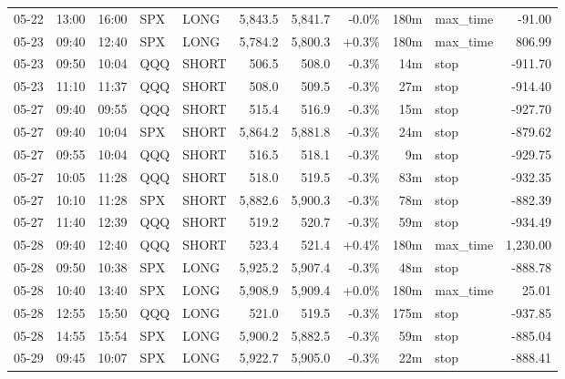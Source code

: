 \documentclass[11pt,a4paper,twoside]{article}
\begin{document}
\begin{center}
\begin{longtable}{>{\color{txtmain}}l l l l l r r r r >{\color{txtmain}}l r}
05-22 & 13:00 & 16:00 & SPX & LONG & 5,843.5 & 5,841.7 & \textcolor{lossred}{-0.0\%} & 180m & max\_time & \textcolor{lossred}{-91.00} \\
05-23 & 09:40 & 12:40 & SPX & LONG & 5,784.2 & 5,800.3 & \textcolor{wingreen}{+0.3\%} & 180m & max\_time & \textcolor{wingreen}{806.99} \\
05-23 & 09:50 & 10:04 & QQQ & SHORT & 506.5 & 508.0 & \textcolor{lossred}{-0.3\%} & 14m & stop & \textcolor{lossred}{-911.70} \\
05-23 & 11:10 & 11:37 & QQQ & SHORT & 508.0 & 509.5 & \textcolor{lossred}{-0.3\%} & 27m & stop & \textcolor{lossred}{-914.40} \\
05-27 & 09:40 & 09:55 & QQQ & SHORT & 515.4 & 516.9 & \textcolor{lossred}{-0.3\%} & 15m & stop & \textcolor{lossred}{-927.70} \\
05-27 & 09:40 & 10:04 & SPX & SHORT & 5,864.2 & 5,881.8 & \textcolor{lossred}{-0.3\%} & 24m & stop & \textcolor{lossred}{-879.62} \\
05-27 & 09:55 & 10:04 & QQQ & SHORT & 516.5 & 518.1 & \textcolor{lossred}{-0.3\%} & 9m & stop & \textcolor{lossred}{-929.75} \\
05-27 & 10:05 & 11:28 & QQQ & SHORT & 518.0 & 519.5 & \textcolor{lossred}{-0.3\%} & 83m & stop & \textcolor{lossred}{-932.35} \\
05-27 & 10:10 & 11:28 & SPX & SHORT & 5,882.6 & 5,900.3 & \textcolor{lossred}{-0.3\%} & 78m & stop & \textcolor{lossred}{-882.39} \\
05-27 & 11:40 & 12:39 & QQQ & SHORT & 519.2 & 520.7 & \textcolor{lossred}{-0.3\%} & 59m & stop & \textcolor{lossred}{-934.49} \\
05-28 & 09:40 & 12:40 & QQQ & SHORT & 523.4 & 521.4 & \textcolor{wingreen}{+0.4\%} & 180m & max\_time & \textcolor{wingreen}{1,230.00} \\
05-28 & 09:50 & 10:38 & SPX & LONG & 5,925.2 & 5,907.4 & \textcolor{lossred}{-0.3\%} & 48m & stop & \textcolor{lossred}{-888.78} \\
05-28 & 10:40 & 13:40 & SPX & LONG & 5,908.9 & 5,909.4 & \textcolor{wingreen}{+0.0\%} & 180m & max\_time & \textcolor{wingreen}{25.01} \\
05-28 & 12:55 & 15:50 & QQQ & LONG & 521.0 & 519.5 & \textcolor{lossred}{-0.3\%} & 175m & stop & \textcolor{lossred}{-937.85} \\
05-28 & 14:55 & 15:54 & SPX & LONG & 5,900.2 & 5,882.5 & \textcolor{lossred}{-0.3\%} & 59m & stop & \textcolor{lossred}{-885.04} \\
05-29 & 09:45 & 10:07 & SPX & LONG & 5,922.7 & 5,905.0 & \textcolor{lossred}{-0.3\%} & 22m & stop & \textcolor{lossred}{-888.41} \\

\end{longtable}
\end{center}
\end{document}
